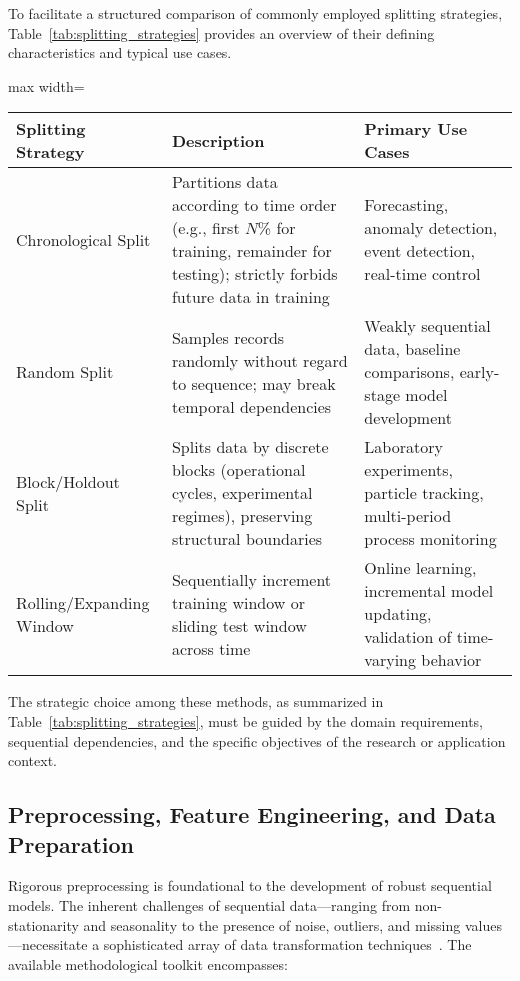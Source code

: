 \documentclass[sigconf]{acmart}
\begin{document}
To facilitate a structured comparison of commonly employed splitting strategies, Table~\ref{tab:splitting_strategies} provides an overview of their defining characteristics and typical use cases.

\begin{table*}[htbp]
\centering
\caption{Comparison of Common Sequential Data Splitting Strategies}
\label{tab:splitting_strategies}
\begin{adjustbox}{max width=\textwidth}
\begin{tabular}{lll}
\toprule
\textbf{Splitting Strategy} & \textbf{Description} & \textbf{Primary Use Cases} \\
\midrule
Chronological Split & Partitions data according to time order (e.g., first $N$\% for training, remainder for testing); strictly forbids future data in training & Forecasting, anomaly detection, event detection, real-time control \\
Random Split & Samples records randomly without regard to sequence; may break temporal dependencies & Weakly sequential data, baseline comparisons, early-stage model development \\
Block/Holdout Split & Splits data by discrete blocks (operational cycles, experimental regimes), preserving structural boundaries & Laboratory experiments, particle tracking, multi-period process monitoring \\
Rolling/Expanding Window & Sequentially increment training window or sliding test window across time & Online learning, incremental model updating, validation of time-varying behavior \\
\bottomrule
\end{tabular}
\end{adjustbox}
\end{table*}

The strategic choice among these methods, as summarized in Table~\ref{tab:splitting_strategies}, must be guided by the domain requirements, sequential dependencies, and the specific objectives of the research or application context.

\subsection{Preprocessing, Feature Engineering, and Data Preparation}

Rigorous preprocessing is foundational to the development of robust sequential models. The inherent challenges of sequential data—ranging from non-stationarity and seasonality to the presence of noise, outliers, and missing values—necessitate a sophisticated array of data transformation techniques~\cite{ref5}. The available methodological toolkit encompasses:
\end{document}
